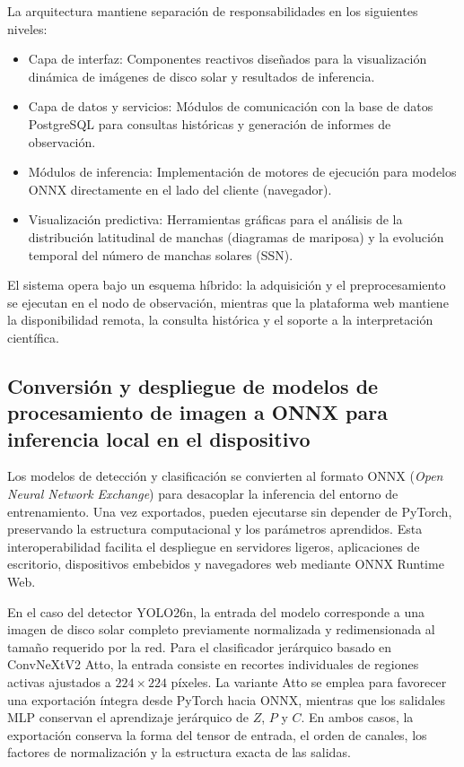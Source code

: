 La arquitectura mantiene separación de responsabilidades en los siguientes
niveles:
\begin{itemize}
    \item Capa de interfaz: Componentes reactivos diseñados para la visualización dinámica de imágenes de disco solar y resultados de inferencia.
    \item Capa de datos y servicios: Módulos de comunicación con la base de datos PostgreSQL para consultas históricas y generación de informes de observación.
    \item Módulos de inferencia: Implementación de motores de ejecución para modelos ONNX directamente en el lado del cliente (navegador).
    \item Visualización predictiva: Herramientas gráficas para el análisis de la distribución latitudinal de manchas (diagramas de mariposa) y la evolución temporal del número de manchas solares (SSN).
\end{itemize}

El sistema opera bajo un esquema híbrido: la adquisición y el preprocesamiento se
ejecutan en el nodo de observación, mientras que la plataforma web mantiene la
disponibilidad remota, la consulta histórica y el soporte a la interpretación
científica.

\label{sec:web}


\subsection{Conversión y despliegue de modelos de procesamiento de imagen a ONNX para inferencia local en el dispositivo}

Los modelos de detección y clasificación se convierten al formato ONNX
(\textit{Open Neural Network Exchange}) para desacoplar la inferencia del entorno
de entrenamiento. Una vez exportados, pueden ejecutarse sin depender de PyTorch,
preservando la estructura computacional y los parámetros aprendidos. Esta
interoperabilidad facilita el despliegue en servidores ligeros, aplicaciones de
escritorio, dispositivos embebidos y navegadores web mediante ONNX
Runtime Web.

En el caso del detector YOLO26n, la entrada del modelo corresponde a una imagen
de disco solar completo previamente normalizada y redimensionada al tamaño
requerido por la red. Para el clasificador jerárquico basado en ConvNeXtV2 Atto, la
entrada consiste en recortes individuales de regiones activas ajustados a
$224 \times 224$ píxeles. La variante Atto se emplea para favorecer una
exportación íntegra desde PyTorch hacia ONNX, mientras que los salidales MLP
conservan el aprendizaje jerárquico de $Z$, $P$ y $C$. En ambos casos, la
exportación conserva la forma del tensor de entrada, el orden de canales, los
factores de normalización y la estructura exacta de las salidas.

